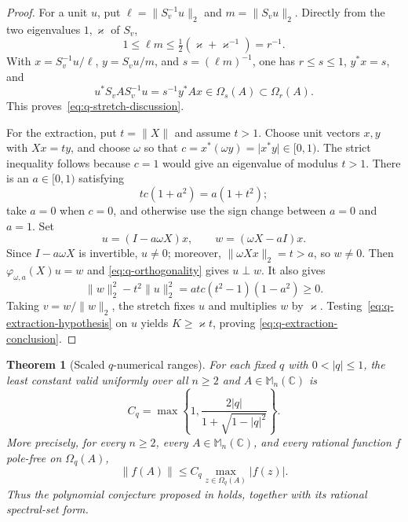 \documentclass[preprints,article,submit,oneauthor]{Definitions/mdpi}
\newcounter{manuscriptresult}[section]
\theoremstyle{mdpi}
\newtheorem{theorem}[manuscriptresult]{Theorem}
\theoremstyle{definition}
\newcommand{\C}{\mathbb C}
\newcommand{\Mn}{\mathbb M_n(\C)}
\begin{document}
\begin{proof}
For a unit $u$, put
$\ell=\lVert S_v^{-1}u\rVert_2$ and
$m=\lVert S_vu\rVert_2$.  Directly from the two eigenvalues
$1,\varkappa$ of $S_v$,
\[
  1\leq\ell m\leq\tfrac12(\varkappa+\varkappa^{-1})=r^{-1}.
\]
With $x=S_v^{-1}u/\ell$, $y=S_vu/m$, and
$s=(\ell m)^{-1}$, one has $r\leq s\leq1$, $y^*x=s$, and
\[
  u^*S_vAS_v^{-1}u=s^{-1}y^*Ax\in\Omega_s(A)
  \subset\Omega_r(A).
\]
This proves~\eqref{eq:q-stretch-discussion}.

For the extraction, put $t=\lVert X\rVert$ and assume $t>1$.
Choose unit vectors $x,y$ with $Xx=ty$, and choose $\omega$ so that
$c=x^*(\omega y)=\lvert x^*y\rvert\in[0,1)$.  The strict inequality
follows because $c=1$ would give an eigenvalue of modulus $t>1$.
There is an
$a\in[0,1)$ satisfying
\begin{equation}
  tc(1+a^2)=a(1+t^2);
  \label{eq:q-orthogonality}
\end{equation}
take $a=0$ when $c=0$, and otherwise use the sign change between
$a=0$ and $a=1$.  Set
\[
  u=(I-a\omega X)x,
  \qquad w=(\omega X-aI)x.
\]
Since $I-a\omega X$ is invertible, $u\neq0$; moreover,
$\lVert\omega Xx\rVert_2=t>a$, so $w\neq0$.  Then
$\varphi_{\omega,a}(X)u=w$ and
\eqref{eq:q-orthogonality} gives $u\perp w$.  It also gives
\[
  \lVert w\rVert_2^2-t^2\lVert u\rVert_2^2
  =atc(t^2-1)(1-a^2)\geq0.
\]
Taking $v=w/\lVert w\rVert_2$, the stretch fixes $u$ and multiplies
$w$ by $\varkappa$.  Testing~\eqref{eq:q-extraction-hypothesis} on
$u$ yields $K\geq\varkappa t$, proving
\eqref{eq:q-extraction-conclusion}.
\end{proof}

\begin{theorem}[Scaled $q$-numerical ranges]
\label{thm:q-range-discussion}
For each fixed $q$ with $0<\lvert q\rvert\leq1$, the least constant
valid uniformly over all
$n\geq2$ and $A\in\Mn$ is
\begin{equation}
  C_q=\max\left\{1,
  \frac{2\lvert q\rvert}
  {1+\sqrt{1-\lvert q\rvert^2}}\right\}.
  \label{eq:q-sharp-discussion}
\end{equation}
More precisely, for every $n\geq2$, every $A\in\Mn$, and every
rational function $f$ pole-free on $\Omega_q(A)$,
\[
 \lVert f(A)\rVert\leq C_q
 \max_{z\in\Omega_q(A)}\lvert f(z)\rvert.
\]
Thus the polynomial conjecture proposed in
\cite{OLoughlinRani2026} holds, together with its rational spectral-set
form.
\end{theorem}
\end{document}

